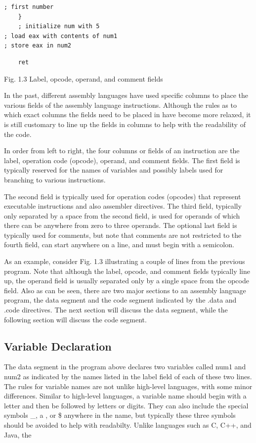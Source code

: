 \documentclass[10pt]{article}
\begin{document}
\begin{verbatim}
; first number
    }
    ; initialize num with 5
; load eax with contents of num1
; store eax in num2
\end{verbatim}

\begin{verbatim}
    ret
\end{verbatim}

Fig. 1.3 Label, opcode, operand, and comment fields

In the past, different assembly languages have used specific columns to place the various fields of the assembly language instructions. Although the rules as to which exact columns the fields need to be placed in have become more relaxed, it is still customary to line up the fields in columns to help with the readability of the code.

In order from left to right, the four columns or fields of an instruction are the label, operation code (opcode), operand, and comment fields. The first field is typically reserved for the names of variables and possibly labels used for branching to various instructions.

The second field is typically used for operation codes (opcodes) that represent executable instructions and also assembler directives. The third field, typically only separated by a space from the second field, is used for operands of which there can be anywhere from zero to three operands. The optional last field is typically used for comments, but note that comments are not restricted to the fourth field, can start anywhere on a line, and must begin with a semicolon.

As an example, consider Fig. 1.3 illustrating a couple of lines from the previous program. Note that although the label, opcode, and comment fields typically line up, the operand field is usually separated only by a single space from the opcode field. Also as can be seen, there are two major sections to an assembly language program, the data segment and the code segment indicated by the .data and .code directives. The next section will discuss the data segment, while the following section will discuss the code segment.

\subsection*{Variable Declaration}
The data segment in the program above declares two variables called num1 and num2 as indicated by the names listed in the label field of each of these two lines. The rules for variable names are not unlike high-level languages, with some minor differences. Similar to high-level languages, a variable name should begin with a letter and then be followed by letters or digits. They can also include the special symbols \_, a , or \$ anywhere in the name, but typically these three symbols should be avoided to help with readabilty. Unlike languages such as C, C++, and Java, the
\end{document}
